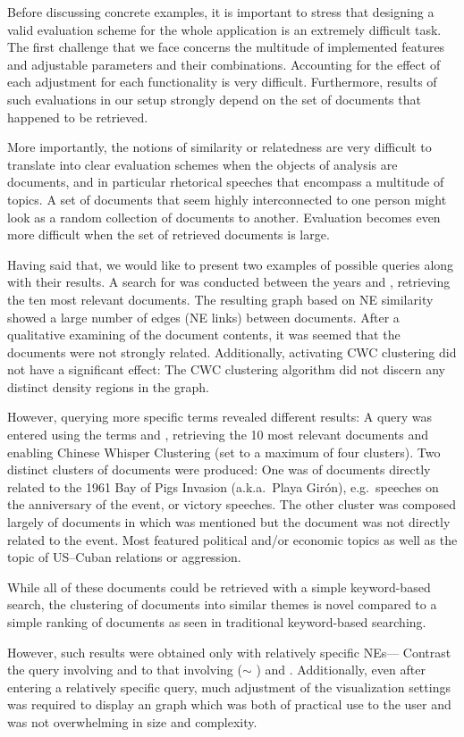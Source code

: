 Before discussing concrete examples, it is important to stress that designing a valid evaluation
scheme for the whole application is an extremely difficult task. The first challenge that we face
concerns the multitude of implemented features and adjustable parameters and their combinations.
Accounting for the effect of each adjustment for each functionality is very difficult. Furthermore,
results of such evaluations in our setup strongly depend on the set of documents that happened to be
retrieved.   

More importantly, the notions of similarity or relatedness are very difficult to translate into clear evaluation schemes when the objects of analysis are documents, and in particular rhetorical speeches that encompass a multitude of topics. A set of documents that seem highly interconnected to one person might look as a random collection of documents to another. Evaluation becomes even more difficult when the set of retrieved documents is large. 

Having said that, we would like to present two examples of possible queries along with their results.
A search for  was conducted between the years  and , retrieving the ten most relevant documents. The resulting graph based on NE similarity showed a large number of 
edges (NE links) between documents. After a qualitative examining of the document contents, it was seemed that the documents were not strongly related. Additionally, activating CWC clustering did not have a significant effect: The CWC clustering algorithm did not discern any distinct density regions in the graph.

However, querying more specific terms revealed different results: A query was entered using the terms  and , retrieving the 10 most relevant documents and enabling Chinese Whisper Clustering (set to a maximum of four clusters). Two distinct clusters of documents were produced: One was of documents directly related to the 1961 Bay of Pigs Invasion (a.k.a.\ Playa Gir\'{o}n), e.g.\ speeches on the anniversary of the event, or victory speeches. The other cluster was composed largely of documents in which  was mentioned but the document was not directly related to the event. Most featured political and/or economic topics as well as the topic of US--Cuban relations or aggression.

While all of these documents could be retrieved with a simple keyword-based search, the clustering of documents into similar themes is novel compared to a simple ranking of documents as seen in traditional keyword-based searching.

However, such results were obtained only with relatively specific NEs--- Contrast the query involving  and  to that involving  ($\sim$ )  and . Additionally, even after entering a relatively specific query, much adjustment of the visualization settings was required to display an graph which was both of practical use to the user and was not overwhelming in size and complexity.
